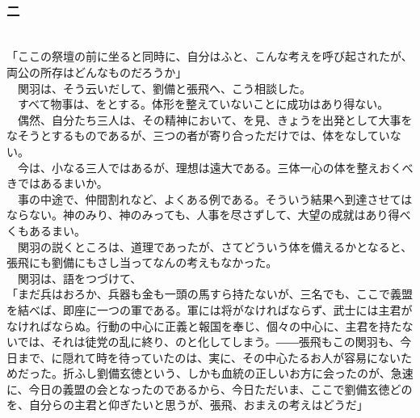 \documentclass[
  paper=a5,
  fontsize=10pt,
  jafontsize=9.5pt,
  tate,                  %
  open_bracket_pos=nibu, %
]{jlreq}
\begin{document}
\\

\subsubsection{二}

\\


「ここの祭壇の前に坐ると同時に、自分はふと、こんな考えを呼び起されたが、両公の所存はどんなものだろうか」\\


　関羽は、そう云いだして、劉備と張飛へ、こう相談した。\\


　すべて物事は、をとする。体形を整えていないことに成功はあり得ない。\\


　偶然、自分たち三人は、その精神において、を見、きょうを出発として大事をなそうとするものであるが、三つの者が寄り合っただけでは、体をなしていない。\\


　今は、小なる三人ではあるが、理想は遠大である。三体一心の体を整えおくべきではあるまいか。\\


　事の中途で、仲間割れなど、よくある例である。そういう結果へ到達させてはならない。神のみり、神のみっても、人事を尽さずして、大望の成就はあり得べくもあるまい。\\


　関羽の説くところは、道理であったが、さてどういう体を備えるかとなると、張飛にも劉備にもさし当ってなんの考えもなかった。\\


　関羽は、語をつづけて、\\


「まだ兵はおろか、兵器も金も一頭の馬すら持たないが、三名でも、ここで義盟を結べば、即座に一つの軍である。軍には将がなければならず、武士には主君がなければならぬ。行動の中心に正義と報国を奉じ、個々の中心に、主君を持たないでは、それは徒党の乱に終り、のと化してしまう。――張飛もこの関羽も、今日まで、に隠れて時を待っていたのは、実に、その中心たるお人が容易にないためだった。折ふし劉備玄徳という、しかも血統の正しいお方に会ったのが、急速に、今日の義盟の会となったのであるから、今日ただいま、ここで劉備玄徳どのを、自分らの主君と仰ぎたいと思うが、張飛、おまえの考えはどうだ」\\
\end{document}
